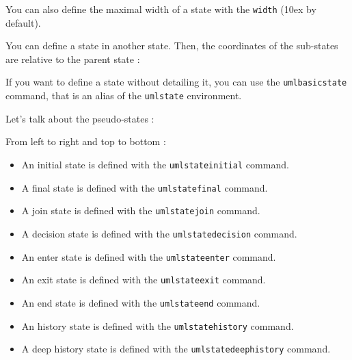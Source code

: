 \documentclass[a4paper,11pt]{report}
\newcommand{\inputTikZ}[1]{%
  }%
\newcommand{\inputTikZ}[1]{%
    \texttt{[image: fig/\#1.pdf]}%
  }%
\begin{document}
\medskip

You can also define the maximal width of a state with the  {\tt width} (10ex by default).

\medskip

You can define a state in another state. Then, the coordinates of the sub-states are relative to the parent state :

\medskip

\begin{minipage}{0.51\textwidth}

\end{minipage}
\begin{minipage}{0.49\textwidth}
\begin{center}
\inputTikZ{stateinner}
\end{center}
\end{minipage}

\medskip

If you want to define a state without detailing it, you can use the {\tt umlbasicstate} command, that is an alias of the {\tt umlstate} environment.

\medskip

Let's talk about the pseudo-states :

\medskip

\begin{minipage}{0.51\textwidth}

\end{minipage}
\begin{minipage}{0.49\textwidth}
\begin{center}
\inputTikZ{statespecial}
\end{center}
\end{minipage}

\medskip

From left to right and top to bottom :

\medskip

\begin{itemize}
\item An initial state is defined with the {\tt umlstateinitial} command.
\item A final state is defined with the {\tt umlstatefinal} command.
\item A join state is defined with the {\tt umlstatejoin} command.
\item A decision state is defined with the {\tt umlstatedecision} command.
\item An enter state is defined with the {\tt umlstateenter} command.
\item An exit state is defined with the {\tt umlstateexit} command.
\item An end state is defined with the {\tt umlstateend} command.
\item An history state is defined with the {\tt umlstatehistory} command.
\item A deep history state is defined with the {\tt umlstatedeephistory} command.
\end{itemize}
\end{document}
